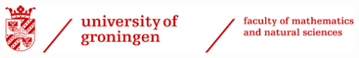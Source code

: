 \begin{titlepage}
    \begin{addmargin}[-1cm]{-3cm}
    \begin{center}
        \large  

        \hfill

        \includegraphics[width=1.3\textwidth]{gfx/rug_logo_large} \\ \medskip

        \vfill
        \vfill

        \begingroup
            \color{Maroon}\spacedallcaps{\myTitle} \\ \bigskip
        \endgroup

        \spacedlowsmallcaps{\myName}

        \vfill
        \vfill


        \mySubtitle \\ \medskip   
        \myDepartment \\                            
        \myFaculty \\
        \myUni \\ \bigskip

        \myTime\ %


    \end{center}  
  \end{addmargin}       
\end{titlepage}   